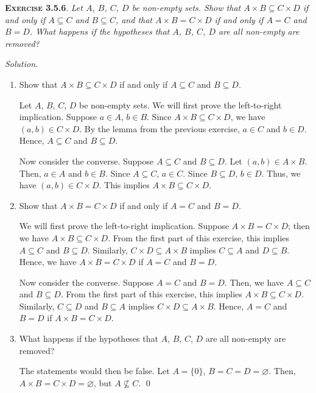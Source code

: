 \documentclass[12pt]{article}
\theoremstyle{remark}
\newenvironment{exer}[2]{
    \noindent \setlength{\parskip}{1em}%
    \textsc{\textbf{Exercise #1}}. \textit{#2} \par
    \noindent \textit{Solution.} %
}{\bigskip}
\begin{document}
\begin{exer}{3.5.6}{
    Let $A$, $B$, $C$, $D$ be non-empty sets.
    Show that $A \times B \subseteq C \times D$ if and only if $A \subseteq C$ and $B \subseteq C$,
    and that $A \times B = C \times D$ if and only if $A = C$ and $B = D$.
    What happens if the hypotheses that $A$, $B$, $C$, $D$ are all non-empty are removed?
}
    \begin{enumerate}[topsep=0mm,label=(\alph*)]
        \item Show that $A \times B \subseteq C \times D$ if and only if $A \subseteq C$ and $B \subseteq D$.
        
            Let $A$, $B$, $C$, $D$ be non-empty sets.
            We will first prove the left-to-right implication.
            Suppose $a \in A$, $b \in B$.
            Since $A \times B \subseteq C \times D$, we have $(a, b) \in C \times D$.
            By the lemma from the previous exercise, $a \in C$ and $b \in D$.
            Hence, $A \subseteq C$ and $B \subseteq D$.

            Now consider the converse.
            Suppose $A \subseteq C$ and $B \subseteq D$.
            Let $(a, b) \in A \times B$.
            Then, $a \in A$ and $b \in B$.
            Since $A \subseteq C$, $a \in C$.
            Since $B \subseteq D$, $b \in D$.
            Thus, we have $(a, b) \in C \times D$.
            This implies $A \times B \subseteq C \times D$.

        \item Show that $A \times B = C \times D$ if and only if $A = C$ and $B = D$.

            We will first prove the left-to-right implication.
            Suppose $A \times B = C \times D$; then we have $A \times B \subseteq C \times D$.
            From the first part of this exercise, this implies  $A \subseteq C$ and $B \subseteq D$.
            Similarly, $C \times D \subseteq A \times B$ implies $C \subseteq A$ and $D \subseteq B$.
            Hence, we have $A \times B = C \times D$ if $A = C$ and $B = D$.

            Now consider the converse.
            Suppose $A = C$ and $B = D$.
            Then, we have $A \subseteq C$ and $B \subseteq D$.
            From the first part of this exercise, this implies $A \times B \subseteq C \times D$.
            Similarly, $C \subseteq D$ and $B \subseteq A$ implies $C \times D \subseteq A \times B$.
            Hence, $A = C$ and $B = D$ if $A \times B = C \times D$.

        \item What happens if the hypotheses that $A$, $B$, $C$, $D$ are all non-empty are removed?

            The statements would then be false.
            Let $A = \{ 0 \}$, $B = C = D = \varnothing$.
            Then, $A \times B = C \times D = \varnothing$, but $A \not\subseteq C$. \qed
    \end{enumerate}
\end{exer}
\end{document}
